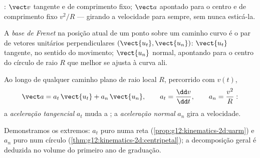 \begin{omfigure}

{\small {}: $\vect v$ tangente e de comprimento
fixo; $\vect a$ apontado para o centro e de comprimento fixo $v^2/R$ ---
girando a velocidade para sempre, sem nunca esticá-la.}
\end{omfigure}

\begin{definition}\label{def:g12:kinematics-2d:frenet}
A \emph{base de Frenet} na posição atual de um
ponto sobre um caminho curvo é o par de vetores unitários
perpendiculares $(\vect{u_t}, \vect{u_n})$: $\vect{u_t}$ tangente, no
sentido do movimento; $\vect{u_n}$ normal, apontando para o centro do
círculo de raio $R$ que melhor se ajusta à curva ali.
\end{definition}

\begin{proposition}\label{prop:g12:kinematics-2d:frenetacc}
Ao longo de qualquer caminho plano de raio local $R$, percorrido com
 $v(t)$,
\[
\vect a = a_t\,\vect{u_t} + a_n\,\vect{u_n},
\qquad a_t = \frac{\dd v}{\dd t},
\qquad a_n = \frac{v^2}{R}:
\]
a \emph{aceleração tangencial} $a_t$ muda a
; a \emph{aceleração normal}
$a_n$ gira a velocidade.
\end{proposition}
\admitted

\begin{remark}\label{rem:g12:kinematics-2d:frenetproof}
Demonstramos os extremos: $a_t$ puro numa reta
(\cref{prop:g12:kinematics-2d:uarm}) e $a_n$ puro num círculo
(\cref{thm:g12:kinematics-2d:centripetal}); a decomposição geral é
deduzida no volume do primeiro ano de graduação.
\end{remark}

